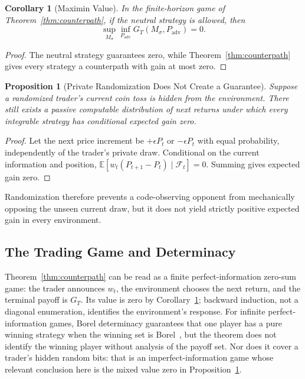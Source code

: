 \documentclass[aps,pra,reprint,superscriptaddress,amsmath,amssymb,floatfix]{revtex4-2}
\theoremstyle{plain}
\newtheorem{corollary}[theorem]{Corollary}
\newtheorem{proposition}[theorem]{Proposition}
\theoremstyle{definition}
\theoremstyle{remark}
\begin{document}
\begin{corollary}[Maximin Value]
  \label{cor:maximin}
  In the finite-horizon game of Theorem~\ref{thm:counterpath}, if the neutral
  strategy is allowed, then
  \[
    \sup_{M_\sigma}\inf_{P_{\mathrm{adv}}}G_T(M_\sigma,P_{\mathrm{adv}})=0.
  \]
\end{corollary}

\begin{proof}
The neutral strategy guarantees zero, while
Theorem~\ref{thm:counterpath} gives every strategy a counterpath with gain at
most zero.
\end{proof}

\begin{proposition}[Private Randomization Does Not Create a Guarantee]
  \label{prop:randomized}
  Suppose a randomized trader's current coin toss is hidden from the
  environment. There still exists a passive computable distribution of next
  returns under which every integrable strategy has conditional expected gain
  zero.
\end{proposition}

\begin{proof}
Let the next price increment be \(+\epsilon P_t\) or \(-\epsilon P_t\) with
equal probability, independently of the trader's private draw. Conditional on
the current information and position,
\(\mathbb{E}[w_t(P_{t+1}-P_t)\mid\mathcal{F}_t]=0\).
Summing gives expected gain zero.
\end{proof}

Randomization therefore prevents a code-observing opponent from mechanically
opposing the unseen current draw, but it does not yield strictly positive
expected gain in every environment.

\subsection{The Trading Game and Determinacy}

Theorem~\ref{thm:counterpath} can be read as a finite perfect-information
zero-sum game: the trader announces \(w_t\), the environment chooses the next
return, and the terminal payoff is \(G_T\). Its value is zero by
Corollary~\ref{cor:maximin}; backward induction, not a diagonal enumeration,
identifies the environment's response. For infinite perfect-information games,
Borel determinacy guarantees that one player has a pure winning strategy when
the winning set is Borel~\cite{Martin1975}, but the theorem does not identify
the winning player without analysis of the payoff set. Nor does it cover a
trader's hidden random bits: that is an imperfect-information game whose
relevant conclusion here is the mixed value zero in
Proposition~\ref{prop:randomized}.
\end{document}
